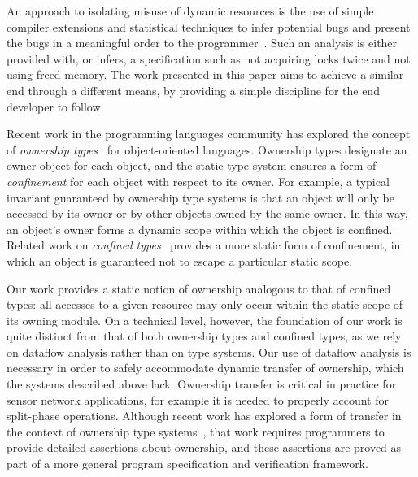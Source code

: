 \cite{archer07interface}



%
An approach to isolating misuse of dynamic resources is the use of
simple compiler extensions and statistical techniques to infer
potential bugs and present the bugs in a meaningful order to the
programmer~\cite{engler00programmer,kremenek06from}.  Such an analysis is
either provided with, or infers, a specification such as not acquiring
locks twice and not using freed memory.  The work presented in this
paper aims to achieve a similar end through a different means, by
providing a simple discipline for the end developer to follow.


Recent work in the programming languages community has explored the
concept of {\em ownership
types}~\cite{ownership,ownership2,BoyapatiEtAl02,aliasjava} for
object-oriented languages.  Ownership types designate an owner object
for each object, and the static type system ensures a form of {\em
confinement} for each object with respect to its owner.  For example,
a typical invariant guaranteed by ownership type systems is that an
object will only be accessed by its owner or by other objects owned by
the same owner.  In this way, an object's owner forms a dynamic scope
within which the object is confined.  Related work on {\em confined
types}~\cite{confined1,confined2} provides a more static form of
confinement, in which an object is guaranteed not to escape a
particular static scope.


Our work provides a static notion of ownership analogous to that of
confined types:  all accesses to a given resource may only occur
within the static scope of its owning module.  On a technical level,
however, the foundation of our work is quite distinct from that of
both ownership types and confined types, as we rely on dataflow
analysis rather than on type systems.  Our use of dataflow analysis is
necessary in order to safely accommodate dynamic transfer of
ownership, which the systems described above lack.  Ownership transfer
is critical in practice for sensor network applications, for example
it is needed 
to properly account for split-phase operations.  Although recent work
has explored a form of transfer in the context of ownership type
systems~\cite{DBLP:conf/ecoop/BanerjeeN05}, that work requires
programmers to provide detailed assertions about ownership, and these
assertions are proved as part of a more general program specification
and verification framework.


